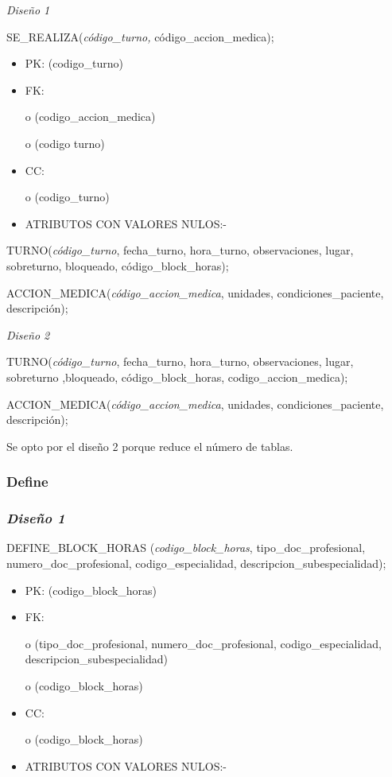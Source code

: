 \documentclass[a4paper,11pt]{article}
\begin{document}
\textit{Diseño 1}

SE\_REALIZA(\emph{código\_turno, }código\_accion\_medica);

\begin{itemize}
\item PK: (codigo\_turno)

\item FK: 

o (codigo\_accion\_medica)

o (codigo turno)

\item CC:

o (codigo\_turno)

\item ATRIBUTOS CON VALORES NULOS:-
\end{itemize}

TURNO(\emph{código\_turno}, fecha\_turno, hora\_turno, observaciones, lugar, sobreturno, 
bloqueado, código\_block\_horas);

ACCION\_MEDICA(\emph{código\_accion\_medica}, unidades, condiciones\_paciente, 
descripción);

\textit{Diseño 2}

TURNO(\emph{código\_turno}, fecha\_turno, hora\_turno, observaciones, lugar, sobreturno 
,bloqueado, código\_block\_horas, codigo\_accion\_medica);

ACCION\_MEDICA(\emph{código\_accion\_medica}, unidades, condiciones\_paciente, 
descripción);

Se opto por el diseño 2 porque reduce el número de tablas.\label{HToc293405851}

\subsubsection{\textbf{Define\label{HToc293405852}}}

\subsubsection{\textit{Diseño 1}}

DEFINE\_BLOCK\_HORAS (\emph{codigo\_block\_horas},  tipo\_doc\_profesional, numero\_doc\_profesional, 
codigo\_especialidad, descripcion\_subespecialidad);

\begin{itemize}
\item PK: (codigo\_block\_horas)

\item FK: 

o (tipo\_doc\_profesional, numero\_doc\_profesional, codigo\_especialidad, descripcion\_subespecialidad)

o (codigo\_block\_horas)

\item CC:

o (codigo\_block\_horas)

\item ATRIBUTOS CON VALORES NULOS:-
\end{itemize}
\end{document}

